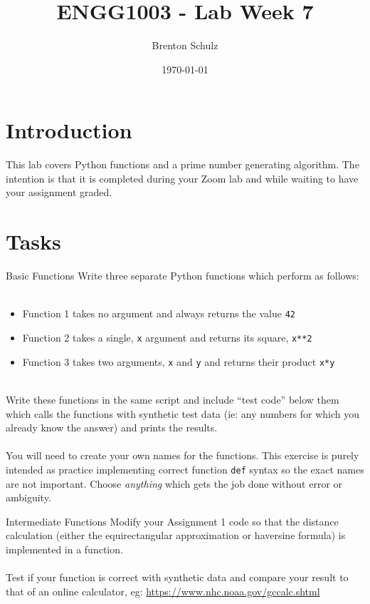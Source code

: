 \documentclass{lab}
\title{ENGG1003 - Lab Week 7}
\author{Brenton Schulz}
\date{\today}
\begin{document}
\maketitle

\section{Introduction}

This lab covers Python functions and a prime number generating algorithm. The intention is that it is completed during your Zoom lab and while waiting to have your assignment graded.

\section{Tasks}

\begin{task}{Basic Functions}{}
Write three separate Python functions which perform as follows:
\\~
\begin{itemize}
\item Function 1 takes no argument and always returns the value \texttt{42}
\item Function 2 takes a single, \texttt{x} argument and returns its square, \texttt{x**2}
\item Function 3 takes two arguments, \texttt{x} and \texttt{y} and returns their product \texttt{x*y}
\end{itemize}
~\\
Write these functions in the same script and include ``test code'' below them which calls the functions with synthetic test data (ie: any numbers for which you already know the answer) and prints the results.
\\~\\
You will need to create your own names for the functions. This exercise is purely intended as practice implementing correct function \texttt{def} syntax so the exact names are not important. Choose \textit{anything} which gets the job done without error or ambiguity.\end{task}

\begin{task}{Intermediate Functions}{}
Modify your Assignment 1 code so that the distance calculation (either the equirectangular approximation or haversine formula) is implemented in a function.
\\~\\
Test if your function is correct with synthetic data and compare your result to that of an online calculator, eg: \url{https://www.nhc.noaa.gov/gccalc.shtml}
\end{task}
\end{document}
